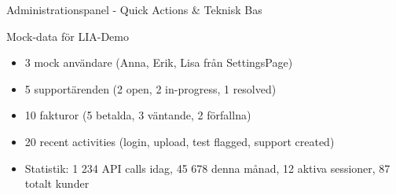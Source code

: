 \documentclass[10pt]{beamer}
\begin{document}
\begin{frame}{Administrationspanel - Quick Actions \& Teknisk Bas}
\begin{block}{Mock-data för LIA-Demo}
  \begin{itemize}
    \item 3 mock användare (Anna, Erik, Lisa från SettingsPage)
    \item 5 supportärenden (2 open, 2 in-progress, 1 resolved)
    \item 10 fakturor (5 betalda, 3 väntande, 2 förfallna)
    \item 20 recent activities (login, upload, test flagged, support created)
    \item Statistik: 1 234 API calls idag, 45 678 denna månad, 12 aktiva sessioner, 87 totalt kunder
  \end{itemize}
\end{block}

\end{frame}
\end{document}
